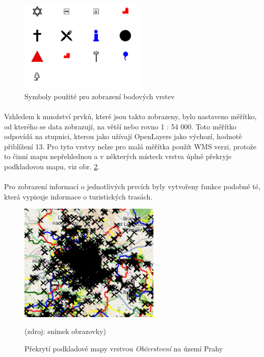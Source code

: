 \documentclass[11pt,a4paper,titlepage,oneside]{book}
\begin{document}
		\begin{figure}[!h]
			\begin{center}
				\includegraphics[width=6cm]{obrazky/toulavej/symbols.png}
				\caption{Symboly použité pro zobrazení bodových vrstev}
				\label{fig:symboly}
			\end{center}
		\end{figure}	

			\paragraph{}Vzhledem k množství prvků, které jsou takto zobrazeny, bylo nastaveno měřítko, od kterého se data zobrazují, na větší nebo rovno 1 : 54 000. Toto měřítko odpovídá na stupnici, kterou jako užívají OpenLayers jako výchozí, hodnotě přiblížení 13. Pro tyto vrstvy nelze pro malá měřítka použít \ac{WMS} verzi, protože to činní mapu nepřehlednou a v některých místech vrstva úplně překryje podkladovou mapu, viz obr. \ref{fig:food}.
		
		\paragraph{}Pro zobrazení informací o jednotlivých prvcích byly vytvořeny funkce podobné té, která vypisuje informace o turistických trasách.

\begin{figure}[!h]
			\begin{center}
				\includegraphics[width=6.7cm]{obrazky/toulavej/food.png}
				\caption{Překrytí podkladové mapy vrstvou  \textit{Občerstvení} na území Prahy}
				\label{fig:food}
				(zdroj: snímek obrazovky)
			\end{center}
		\end{figure}	
\end{document}

